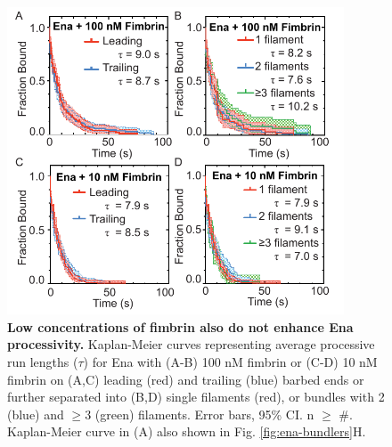 \begin{figure}
\centering
\includegraphics[width=10cm]{img/ch02/low_fimbrin.pdf}
\caption[Low concentrations of fimbrin also do not enhance Ena processivity.]{\textbf{Low concentrations of fimbrin also do not enhance Ena processivity.} Kaplan-Meier curves representing average processive run lengths ($\tau$) for Ena with (A-B) 100 nM fimbrin or (C-D) 10 nM fimbrin on (A,C) leading (red) and trailing (blue) barbed ends or further separated into (B,D) single filaments (red), or bundles with 2 (blue) and $\geq$3 (green) filaments. Error bars, 95\% CI. n $\geq$ \#.  Kaplan-Meier curve in (A) also shown in Fig. \ref{fig:ena-bundlers}H.}
\label{fig:ena-low-fim}
\end{figure}


